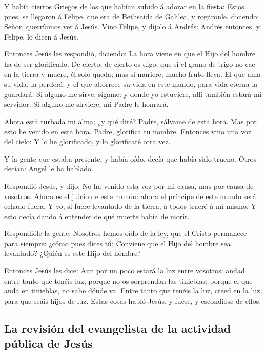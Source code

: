  Y había ciertos Griegos de los que habían subido á
adorar en la fiesta:  Estos pues, se llegaron á Felipe,
que era de Bethsaida de Galilea, y rogáronle, diciendo: Señor,
querríamos ver á Jesús.  Vino Felipe, y díjolo á Andrés:
Andrés entonces, y Felipe, lo dicen á Jesús.

 Entonces Jesús les respondió, diciendo: La hora viene en
que el Hijo del hombre ha de ser glorificado.  De cierto,
de cierto os digo, que si el grano de trigo no cae en la tierra y muere,
él solo queda; mas si muriere, mucho fruto lleva.  El que
ama su vida, la perderá; y el que aborrece su vida en este mundo, para
vida eterna la guardará.  Si alguno me sirve, sígame: y
donde yo estuviere, allí también estará mi servidor. Si alguno me
sirviere, mi Padre le honrará.

 Ahora está turbada mi alma; ¿y qué diré? Padre, sálvame
de esta hora. Mas por esto he venido en esta hora. 
Padre, glorifica tu nombre. Entonces vino una voz del cielo: Y lo he
glorificado, y lo glorificaré otra vez.

 Y la gente que estaba presente, y había oído, decía que
había sido trueno. Otros decían: Angel le ha hablado.

 Respondió Jesús, y dijo: No ha venido esta voz por mi
causa, mas por causa de vosotros.  Ahora es el juicio de
este mundo: ahora el príncipe de este mundo será echado fuera.
 Y yo, si fuere levantado de la tierra, á todos traeré á
mí mismo.  Y esto decía dando á entender de qué muerte
había de morir.

 Respondióle la gente: Nosotros hemos oído de la ley, que
el Cristo permanece para siempre: ¿cómo pues dices tú: Conviene que el
Hijo del hombre sea levantado? ¿Quién es este Hijo del hombre?

 Entonces Jesús les dice: Aun por un poco estará la luz
entre vosotros: andad entre tanto que tenéis luz, porque no os
sorprendan las tinieblas; porque el que anda en tinieblas, no sabe dónde
va.  Entre tanto que tenéis la luz, creed en la luz, para
que seáis hijos de luz. Estas cosas habló Jesús, y fuése, y escondióse
de ellos.

\hypertarget{la-revisiuxf3n-del-evangelista-de-la-actividad-puxfablica-de-jesuxfas}{%
\subsection{La revisión del evangelista de la actividad pública de
Jesús}\label{la-revisiuxf3n-del-evangelista-de-la-actividad-puxfablica-de-jesuxfas}}


